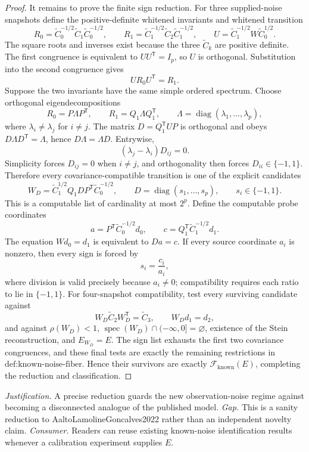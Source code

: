 \documentclass{article}
\begin{document}
\begin{proof}
It remains to prove the finite sign reduction.  For three supplied-noise snapshots define the positive-definite whitened invariants and whitened transition
\[
 R_0=\widetilde C_0^{-1/2}\widetilde C_1\widetilde C_0^{-1/2},
 \qquad
 R_1=\widetilde C_1^{-1/2}\widetilde C_2\widetilde C_1^{-1/2},
 \qquad
 U=\widetilde C_1^{-1/2}W\widetilde C_0^{1/2}.
\]
The square roots and inverses exist because the three \(\widetilde C_k\) are positive definite.  The first congruence is equivalent to \(UU^{\mathsf T}=I_p\), so \(U\) is orthogonal.  Substitution into the second congruence gives
\[
 UR_0U^{\mathsf T}=R_1.
\]
Suppose the two invariants have the same simple ordered spectrum.  Choose orthogonal eigendecompositions
\[
 R_0=P\Lambda P^{\mathsf T},
 \qquad
 R_1=Q_1\Lambda Q_1^{\mathsf T},
 \qquad
 \Lambda=\operatorname{diag}(\lambda_1,\ldots,\lambda_p),
\]
where \(\lambda_i\ne\lambda_j\) for \(i\ne j\).  The matrix \(D=Q_1^{\mathsf T}UP\) is orthogonal and obeys \(D\Lambda D^{\mathsf T}=\Lambda\), hence \(D\Lambda=\Lambda D\).  Entrywise,
\[
 (\lambda_j-\lambda_i)D_{ij}=0.
\]
Simplicity forces \(D_{ij}=0\) when \(i\ne j\), and orthogonality then forces \(D_{ii}\in\{-1,1\}\).  Therefore every covariance-compatible transition is one of the explicit candidates
\[
 W_D=\widetilde C_1^{1/2}Q_1DP^{\mathsf T}\widetilde C_0^{-1/2},
 \qquad
 D=\operatorname{diag}(s_1,\ldots,s_p),
 \qquad
 s_i\in\{-1,1\}.
\]
This is a computable list of cardinality at most \(2^p\).  Define the computable probe coordinates
\[
 a=P^{\mathsf T}\widetilde C_0^{-1/2}d_0,
 \qquad
 c=Q_1^{\mathsf T}\widetilde C_1^{-1/2}d_1.
\]
The equation \(Wd_0=d_1\) is equivalent to \(Da=c\).  If every source coordinate \(a_i\) is nonzero, then every sign is forced by
\[
 s_i=\frac{c_i}{a_i},
\]
where division is valid precisely because \(a_i\ne0\); compatibility requires each ratio to lie in \(\{-1,1\}\).  For four-snapshot compatibility, test every surviving candidate against
\[
 W_D\widetilde C_2W_D^{\mathsf T}=\widetilde C_3,
 \qquad
 W_Dd_1=d_2,
\]
and against \(\rho(W_D)<1\), \(\operatorname{spec}(W_D)\cap(-\infty,0]=\varnothing\), existence of the Stein reconstruction, and \(E_{W_D}=E\).  The sign list exhausts the first two covariance congruences, and these final tests are exactly the remaining restrictions in \(\text{def:known-noise-fiber}\).  Hence their survivors are exactly \(\mathcal F_{\mathrm{known}}(E)\), completing the reduction and classification.
\end{proof}
\par\smallskip\noindent \textit{Justification.} A precise reduction guards the new observation-noise regime against becoming a disconnected analogue of the published model. \textit{Gap.} This is a sanity reduction to AaltoLamolineGoncalves2022 rather than an independent novelty claim. \textit{Consumer.} Readers can reuse existing known-noise identification results whenever a calibration experiment supplies \(E\).
\end{document}
